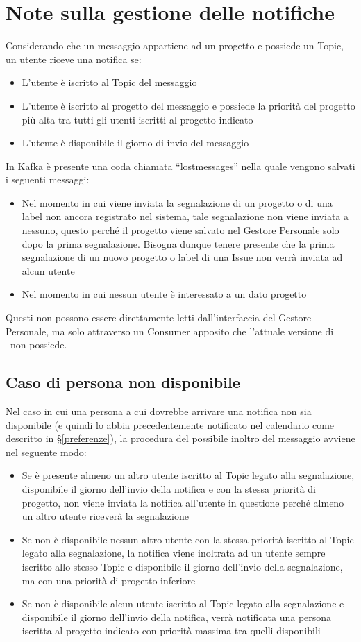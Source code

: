 \section{Note sulla gestione delle notifiche}\label{note}
Considerando che un messaggio appartiene ad un progetto e possiede un  Topic, un utente riceve una notifica se:
\begin{itemize}
    \item L'utente è iscritto al Topic del messaggio
    \item L'utente è iscritto al progetto del messaggio e possiede la priorità del progetto più alta tra tutti gli utenti iscritti al progetto indicato
    \item L'utente è disponibile il giorno di invio del messaggio
\end{itemize}
In Kafka è presente una coda chiamata ``lostmessages'' nella quale vengono salvati i seguenti messaggi:
\begin{itemize}
    \item Nel momento in cui viene inviata la segnalazione di un progetto o di una label non ancora registrato nel sistema, tale segnalazione non viene inviata a nessuno, questo perché il progetto viene salvato nel Gestore Personale solo dopo la prima segnalazione. Bisogna dunque tenere presente che la prima segnalazione di un nuovo progetto o label di una Issue non verrà inviata ad alcun utente
    \item Nel momento in cui nessun utente è interessato a un dato progetto
\end{itemize}
Questi non possono essere direttamente letti dall'interfaccia del Gestore Personale, ma solo attraverso un Consumer apposito che l'attuale versione di \progetto\ non possiede.

\subsection{Caso di persona non disponibile}
Nel caso in cui una persona a cui dovrebbe arrivare una notifica non sia disponibile (e quindi lo abbia precedentemente notificato nel calendario come descritto in \S\ref{preferenze}), la procedura del possibile inoltro del messaggio avviene nel seguente modo:
\begin{itemize}
    \item Se è presente almeno un altro utente iscritto al Topic legato alla segnalazione, disponibile
    il giorno dell’invio della notifica e con la stessa priorità di progetto, non viene inviata la
    notifica all’utente in questione perché almeno un altro utente riceverà la segnalazione
    \item Se non è disponibile nessun altro utente con la stessa priorità iscritto al Topic legato alla
    segnalazione, la notifica viene inoltrata ad un utente sempre iscritto allo stesso Topic e
    disponibile il giorno dell’invio della segnalazione, ma con una priorità di progetto inferiore
    \item Se non è disponibile alcun utente iscritto al Topic legato alla segnalazione e disponibile
    il giorno dell’invio della notifica, verrà notificata una persona iscritta al progetto indicato
    con priorità massima tra quelli disponibili
\end{itemize}

